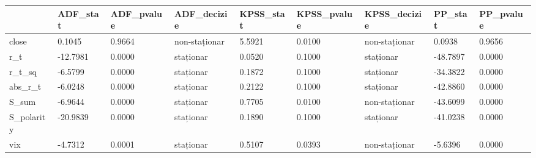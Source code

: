 \begin{tabular}{lllllllll}
\toprule
 & ADF_stat & ADF_pvalue & ADF_decizie & KPSS_stat & KPSS_pvalue & KPSS_decizie & PP_stat & PP_pvalue \\
\midrule
close & 0.1045 & 0.9664 & non-staționar & 5.5921 & 0.0100 & non-staționar & 0.0938 & 0.9656 \\
r_t & -12.7981 & 0.0000 & staționar & 0.0520 & 0.1000 & staționar & -48.7897 & 0.0000 \\
r_t_sq & -6.5799 & 0.0000 & staționar & 0.1872 & 0.1000 & staționar & -34.3822 & 0.0000 \\
abs_r_t & -6.0248 & 0.0000 & staționar & 0.2122 & 0.1000 & staționar & -42.8860 & 0.0000 \\
S_sum & -6.9644 & 0.0000 & staționar & 0.7705 & 0.0100 & non-staționar & -43.6099 & 0.0000 \\
S_polarity & -20.9839 & 0.0000 & staționar & 0.1890 & 0.1000 & staționar & -41.0238 & 0.0000 \\
vix & -4.7312 & 0.0001 & staționar & 0.5107 & 0.0393 & non-staționar & -5.6396 & 0.0000 \\
\bottomrule
\end{tabular}
